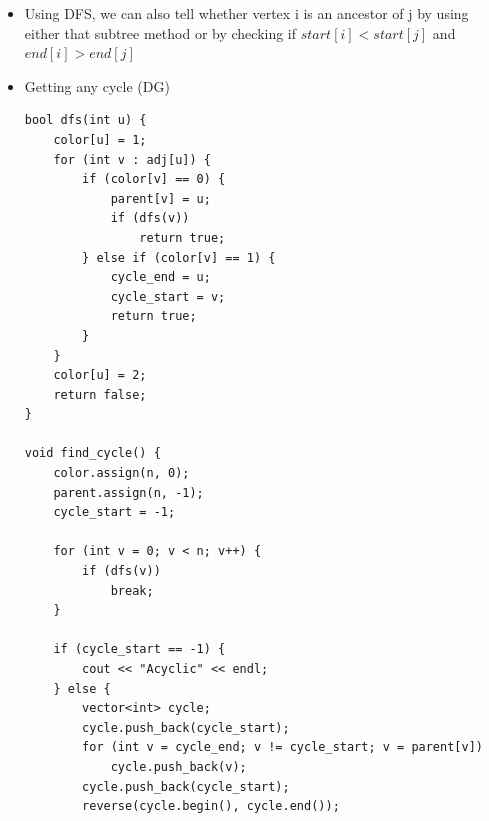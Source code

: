 \documentclass[8pt, a4paper, oneside, twocolumn]{extarticle}
\begin{document}
\begin{itemize}
    \begin{verbatim}
void graphcheck (int u) {
    dfs_num[u] = explored;
    start[u] = counter;
    counter++;
    for (auto &v : adjlist[u]) {
        if (dfs_num[v] == unvisited) {  // tree edge
            dfs_parent[v] = u;
            graphcheck (v);
        } else if (dfs_num[v] == explored) {  // back edge hence not DAG.
            if (v == dfs_parent[u]) cout << "two ways\n"
            else cout << "back edge\n"
        } else {  // dfs_num[v] == visited
            // either its a forward edge or cross edge. If v_s > u_s then forward else cross.
            // in general:
            // Tree/forward edge if [u [v v] u], i.e.: start[u] < start[v] & end[v] < end[u] 
            // cross if: [v v] [u u], i.e., v_s < v_e < u_s < u_e.
            // [v [u u] v] back
        }
    }
    dfs_num[u] = visited;
    end[u] = counter;
    counter++;
}
    \end{verbatim}
     \textit{By Stimpy at English Wikipedia - Image created by Stimpy 20:01, 17 December 2006 (UTC), Public Domain, https://commons.wikimedia.org/w/index.php?curid=26561681}
    \item Using DFS, we can also tell whether vertex i is an ancestor of j by using either that subtree method or by checking if $start[i] < start[j]$ and $end[i] > end[j]$
    \item Getting any cycle (DG)
\begin{verbatim}
bool dfs(int u) {
    color[u] = 1;
    for (int v : adj[u]) {
        if (color[v] == 0) {
            parent[v] = u;
            if (dfs(v))
                return true;
        } else if (color[v] == 1) {
            cycle_end = u;
            cycle_start = v;
            return true;
        }
    }
    color[u] = 2;
    return false;
}

void find_cycle() {
    color.assign(n, 0);
    parent.assign(n, -1);
    cycle_start = -1;

    for (int v = 0; v < n; v++) {
        if (dfs(v))
            break;
    }

    if (cycle_start == -1) {
        cout << "Acyclic" << endl;
    } else {
        vector<int> cycle;
        cycle.push_back(cycle_start);
        for (int v = cycle_end; v != cycle_start; v = parent[v])
            cycle.push_back(v);
        cycle.push_back(cycle_start);
        reverse(cycle.begin(), cycle.end());


\end{verbatim}
\end{itemize}
\end{document}
